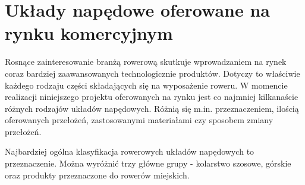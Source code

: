 \section{Układy napędowe oferowane na rynku komercyjnym}

Rosnące zainteresowanie branżą rowerową skutkuje wprowadzaniem na rynek coraz bardziej zaawansowanych technologicznie produktów. Dotyczy to właściwie każdego rodzaju części składających się na wyposażenie roweru. W momencie realizacji niniejszego projektu oferowanych na rynku jest co najmniej kilkanaście różnych rodzajów układów napędowych. Różnią się m.in. przeznaczeniem, ilością oferowanych przełożeń, zastosowanymi materiałami czy sposobem zmiany przełożeń.

Najbardziej ogólna klasyfikacja rowerowych układów napędowych to przeznaczenie. Można wyróżnić trzy główne grupy - kolarstwo szosowe, górskie oraz produkty przeznaczone do rowerów miejskich.

